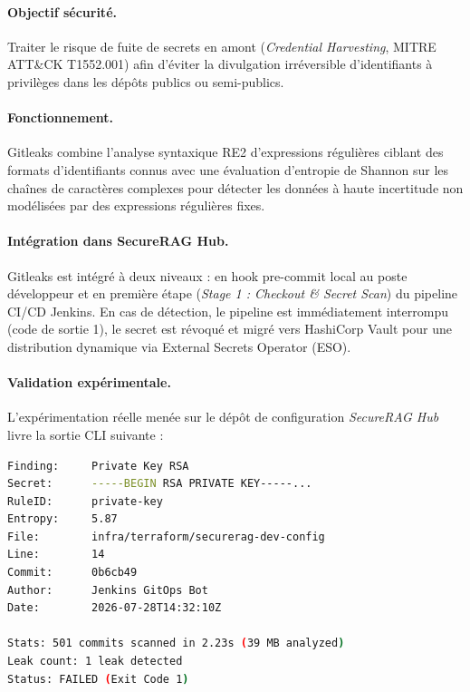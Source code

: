 \paragraph{Objectif sécurité.}
Traiter le risque de fuite de secrets en amont (\textit{Credential Harvesting}, MITRE ATT\&CK T1552.001) afin d'éviter la divulgation irréversible d'identifiants à privilèges dans les dépôts publics ou semi-publics.

\paragraph{Fonctionnement.}
Gitleaks combine l'analyse syntaxique RE2 d'expressions régulières ciblant des formats d'identifiants connus avec une évaluation d'entropie de Shannon sur les chaînes de caractères complexes pour détecter les données à haute incertitude non modélisées par des expressions régulières fixes.

\paragraph{Intégration dans SecureRAG Hub.}
Gitleaks est intégré à deux niveaux : en hook pre-commit local au poste développeur et en première étape (\textit{Stage 1 : Checkout \& Secret Scan}) du pipeline CI/CD Jenkins. En cas de détection, le pipeline est immédiatement interrompu (code de sortie 1), le secret est révoqué et migré vers HashiCorp Vault pour une distribution dynamique via External Secrets Operator (ESO).

\paragraph{Validation expérimentale.}
L'expérimentation réelle menée sur le dépôt de configuration \textit{SecureRAG Hub} livre la sortie CLI suivante :

\begin{lstlisting}[language=bash, caption={Capture réelle de l'exécution Gitleaks sur le dépôt SecureRAG Hub}, label={lst:gitleaks_real_exec}]
Finding:     Private Key RSA
Secret:      -----BEGIN RSA PRIVATE KEY-----...
RuleID:      private-key
Entropy:     5.87
File:        infra/terraform/securerag-dev-config
Line:        14
Commit:      0b6cb49
Author:      Jenkins GitOps Bot
Date:        2026-07-28T14:32:10Z

Stats: 501 commits scanned in 2.23s (39 MB analyzed)
Leak count: 1 leak detected
Status: FAILED (Exit Code 1)
\end{lstlisting}

